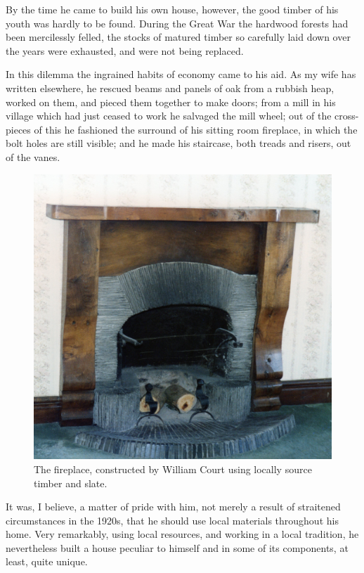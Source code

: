 By the time he came to build his own house, however, the good timber of his youth was hardly to be found. During the Great War the hardwood forests had been mercilessly felled, the stocks of matured timber so carefully laid down over the years were exhausted, and were not being replaced.

In this dilemma the ingrained habits of economy came to his aid. As my wife has written elsewhere, he rescued beams and panels of oak from a rubbish heap, worked on them, and pieced them together to make doors; from a mill in his village which had just ceased to work he salvaged the mill wheel; out of the cross-pieces of this he fashioned the surround of his sitting room fireplace, in which the bolt holes are still visible; and he made his staircase, both treads and risers, out of the vanes.

\begin{figure}
	\centering
     \includegraphics[width=1\textwidth]{figures/Fireplace}
     \caption{The fireplace, constructed by William Court using locally source timber and slate.}
     \label{fig:Fireplace}
\end{figure}

It was, I believe, a matter of pride with him, not merely a result of straitened circumstances in the 1920s, that he should use local materials throughout his home. Very remarkably, using local resources, and working in a local tradition, he nevertheless built a house peculiar to himself and in some of its components, at least, quite unique.

